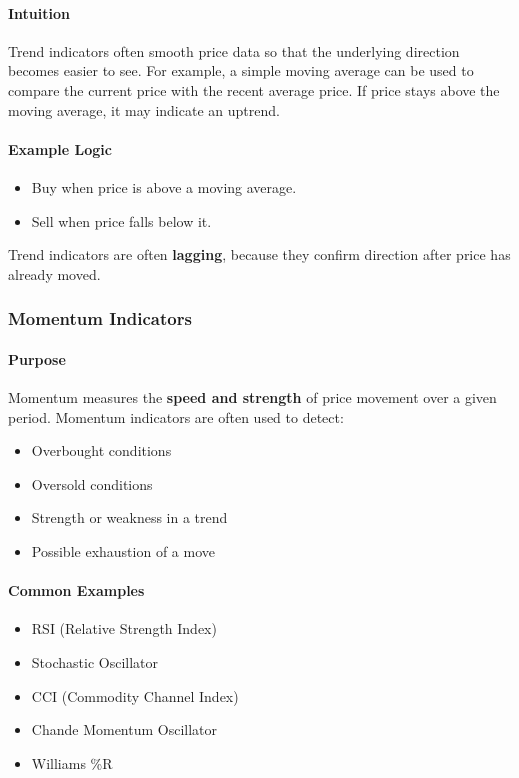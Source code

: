 \documentclass[12pt,openany]{book}
\begin{document}
\paragraph{Intuition}
Trend indicators often smooth price data so that the underlying direction becomes easier to see. For example, a simple moving average can be used to compare the current price with the recent average price. If price stays above the moving average, it may indicate an uptrend.

\paragraph{Example Logic}
\begin{itemize}[leftmargin=*]
    \item Buy when price is above a moving average.
    \item Sell when price falls below it.
\end{itemize}

Trend indicators are often \textbf{lagging}, because they confirm direction after price has already moved.

\subsubsection{Momentum Indicators}

\paragraph{Purpose}
Momentum measures the \textbf{speed and strength} of price movement over a given period. Momentum indicators are often used to detect:

\begin{itemize}[leftmargin=*]
    \item Overbought conditions
    \item Oversold conditions
    \item Strength or weakness in a trend
    \item Possible exhaustion of a move
\end{itemize}

\paragraph{Common Examples}
\begin{itemize}[leftmargin=*]
    \item RSI (Relative Strength Index)
    \item Stochastic Oscillator
    \item CCI (Commodity Channel Index)
    \item Chande Momentum Oscillator
    \item Williams \%R
\end{itemize}
\end{document}
